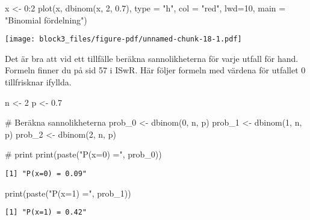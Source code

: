 \documentclass[
  letterpaper,
  DIV=11,
  numbers=noendperiod]{scrartcl}
\newenvironment{Shaded}{\begin{snugshade}}{\end{snugshade}}
\newcommand{\AttributeTok}[1]{\textcolor[rgb]{0.40,0.45,0.13}{#1}}
\newcommand{\CommentTok}[1]{\textcolor[rgb]{0.37,0.37,0.37}{#1}}
\newcommand{\DecValTok}[1]{\textcolor[rgb]{0.68,0.00,0.00}{#1}}
\newcommand{\FloatTok}[1]{\textcolor[rgb]{0.68,0.00,0.00}{#1}}
\newcommand{\FunctionTok}[1]{\textcolor[rgb]{0.28,0.35,0.67}{#1}}
\newcommand{\NormalTok}[1]{\textcolor[rgb]{0.00,0.23,0.31}{#1}}
\newcommand{\OtherTok}[1]{\textcolor[rgb]{0.00,0.23,0.31}{#1}}
\newcommand{\SpecialCharTok}[1]{\textcolor[rgb]{0.37,0.37,0.37}{#1}}
\newcommand{\StringTok}[1]{\textcolor[rgb]{0.13,0.47,0.30}{#1}}
\begin{document}
\begin{Shaded}
\begin{Highlighting}[]
\NormalTok{x }\OtherTok{\textless{}{-}} \DecValTok{0}\SpecialCharTok{:}\DecValTok{2}
\FunctionTok{plot}\NormalTok{(x, }\FunctionTok{dbinom}\NormalTok{(x, }\DecValTok{2}\NormalTok{, }\FloatTok{0.7}\NormalTok{), }\AttributeTok{type =} \StringTok{"h"}\NormalTok{, }\AttributeTok{col =} \StringTok{"red"}\NormalTok{, }\AttributeTok{lwd=}\DecValTok{10}\NormalTok{, }\AttributeTok{main =} \StringTok{"Binomial fördelning"}\NormalTok{)}
\end{Highlighting}
\end{Shaded}

\texttt{[image: block3\_files/figure-pdf/unnamed-chunk-18-1.pdf]}

Det är bra att vid ett tillfälle beräkna sannolikheterna för varje
utfall för hand. Formeln finner du på sid 57 i ISwR. Här följer formeln
med värdena för utfallet 0 tillfrisknar ifyllda.

\begin{Shaded}
\begin{Highlighting}[]
\NormalTok{n }\OtherTok{\textless{}{-}} \DecValTok{2}
\NormalTok{p }\OtherTok{\textless{}{-}} \FloatTok{0.7}

\CommentTok{\# Beräkna sannolikheterna}
\NormalTok{prob\_0 }\OtherTok{\textless{}{-}} \FunctionTok{dbinom}\NormalTok{(}\DecValTok{0}\NormalTok{, n, p)}
\NormalTok{prob\_1 }\OtherTok{\textless{}{-}} \FunctionTok{dbinom}\NormalTok{(}\DecValTok{1}\NormalTok{, n, p)}
\NormalTok{prob\_2 }\OtherTok{\textless{}{-}} \FunctionTok{dbinom}\NormalTok{(}\DecValTok{2}\NormalTok{, n, p)}

\CommentTok{\# print}
\FunctionTok{print}\NormalTok{(}\FunctionTok{paste}\NormalTok{(}\StringTok{"P(x=0) ="}\NormalTok{, prob\_0))}
\end{Highlighting}
\end{Shaded}

\begin{verbatim}
[1] "P(x=0) = 0.09"
\end{verbatim}

\begin{Shaded}
\begin{Highlighting}[]
\FunctionTok{print}\NormalTok{(}\FunctionTok{paste}\NormalTok{(}\StringTok{"P(x=1) ="}\NormalTok{, prob\_1))}
\end{Highlighting}
\end{Shaded}

\begin{verbatim}
[1] "P(x=1) = 0.42"
\end{verbatim}
\end{document}

